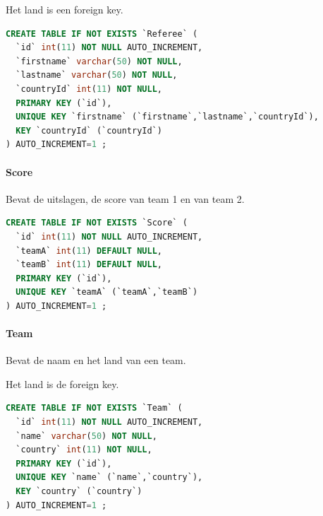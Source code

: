 \documentclass[11pt]{article}
\begin{document}
        Het land is een foreign key.
        
        \begin{framed}
        \begin{lstlisting}[language=sql]
CREATE TABLE IF NOT EXISTS `Referee` (
  `id` int(11) NOT NULL AUTO_INCREMENT,
  `firstname` varchar(50) NOT NULL,
  `lastname` varchar(50) NOT NULL,
  `countryId` int(11) NOT NULL,
  PRIMARY KEY (`id`),
  UNIQUE KEY `firstname` (`firstname`,`lastname`,`countryId`),
  KEY `countryId` (`countryId`)
) AUTO_INCREMENT=1 ;
        \end{lstlisting}
        \end{framed}
        
        
        
        
    \paragraph{Score}
        Bevat de uitslagen, de score van team 1 en van team 2.
        
        \begin{framed}
        \begin{lstlisting}[language=sql]
CREATE TABLE IF NOT EXISTS `Score` (
  `id` int(11) NOT NULL AUTO_INCREMENT,
  `teamA` int(11) DEFAULT NULL,
  `teamB` int(11) DEFAULT NULL,
  PRIMARY KEY (`id`),
  UNIQUE KEY `teamA` (`teamA`,`teamB`)
) AUTO_INCREMENT=1 ;
        \end{lstlisting}
        \end{framed}
        
        
        
    
    \paragraph{Team}
        Bevat de naam en het land van een team.   
        
        Het land is de foreign key.
        
        \begin{framed}
        \begin{lstlisting}[language=sql]
CREATE TABLE IF NOT EXISTS `Team` (
  `id` int(11) NOT NULL AUTO_INCREMENT,
  `name` varchar(50) NOT NULL,
  `country` int(11) NOT NULL,
  PRIMARY KEY (`id`),
  UNIQUE KEY `name` (`name`,`country`),
  KEY `country` (`country`)
) AUTO_INCREMENT=1 ;
        \end{lstlisting}
        \end{framed}
        
\end{document}
